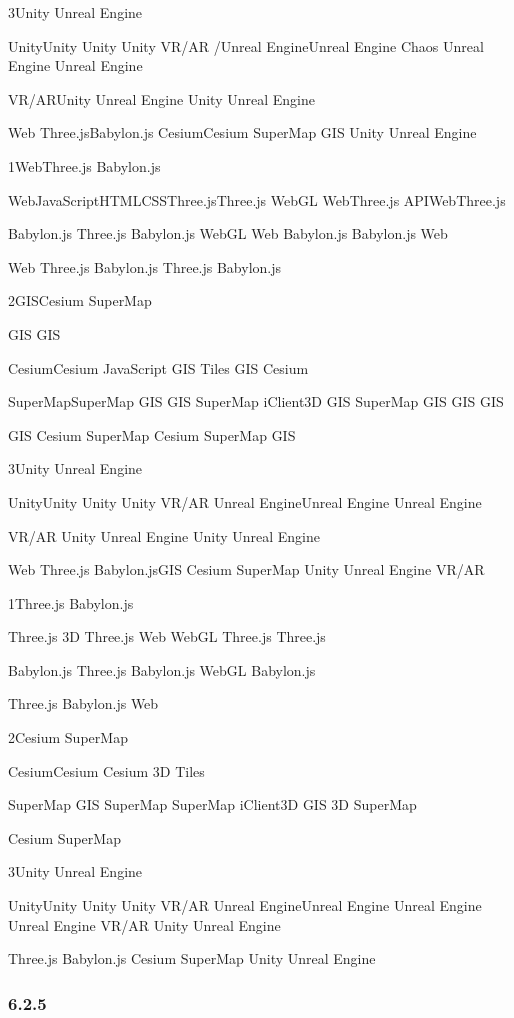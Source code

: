 3Unity Unreal Engine

UnityUnity Unity Unity VR/AR /Unreal EngineUnreal Engine Chaos Unreal
Engine Unreal Engine

VR/ARUnity Unreal Engine Unity Unreal Engine

Web Three.jsBabylon.js CesiumCesium SuperMap GIS Unity Unreal Engine

1WebThree.js Babylon.js

WebJavaScriptHTMLCSSThree.jsThree.js WebGL WebThree.js APIWebThree.js

Babylon.js Three.js Babylon.js WebGL Web Babylon.js Babylon.js Web

Web Three.js Babylon.js Three.js Babylon.js

2GISCesium SuperMap

GIS GIS

CesiumCesium JavaScript GIS Tiles GIS Cesium

SuperMapSuperMap GIS GIS SuperMap iClient3D GIS SuperMap GIS GIS GIS

GIS Cesium SuperMap Cesium SuperMap GIS

3Unity Unreal Engine

UnityUnity Unity Unity VR/AR Unreal EngineUnreal Engine Unreal Engine

VR/AR Unity Unreal Engine Unity Unreal Engine

Web Three.js Babylon.jsGIS Cesium SuperMap Unity Unreal Engine VR/AR

1Three.js Babylon.js

Three.js 3D Three.js Web WebGL Three.js Three.js

Babylon.js Three.js Babylon.js WebGL Babylon.js

Three.js Babylon.js Web

2Cesium SuperMap

CesiumCesium Cesium 3D Tiles

SuperMap GIS SuperMap SuperMap iClient3D GIS 3D SuperMap

Cesium SuperMap

3Unity Unreal Engine

UnityUnity Unity Unity VR/AR Unreal EngineUnreal Engine Unreal Engine
Unreal Engine VR/AR Unity Unreal Engine

Three.js Babylon.js Cesium SuperMap Unity Unreal Engine

\hypertarget{section-54}{%
\subsubsection{6.2.5}\label{section-54}}

